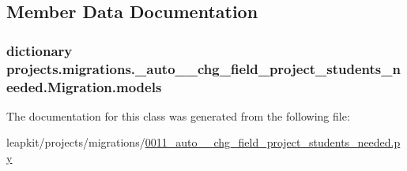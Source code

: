 \subsection{Member Data Documentation}
\hypertarget{classprojects_1_1migrations_1_10011__auto____chg__field__project__students__needed_1_1_migration_a1642da397d0123bedb7e2ae0fa21395c}{
\subsubsection[{models}]{\setlength{\rightskip}{0pt plus 5cm}dictionary projects.\-migrations.\-\_\-auto\-\_\-\-\_\-chg\-\_\-field\-\_\-project\-\_\-students\-\_\-needed.\-Migration.\-models\hspace{0.3cm}{\ttfamily [static]}}}\label{classprojects_1_1migrations_1_10011__auto____chg__field__project__students__needed_1_1_migration_a1642da397d0123bedb7e2ae0fa21395c}


The documentation for this class was generated from the following file\-:\begin{DoxyCompactItemize}
\item 
leapkit/projects/migrations/\hyperlink{0011__auto____chg__field__project__students__needed_8py}{0011\-\_\-auto\-\_\-\-\_\-chg\-\_\-field\-\_\-project\-\_\-students\-\_\-needed.\-py}\end{DoxyCompactItemize}
